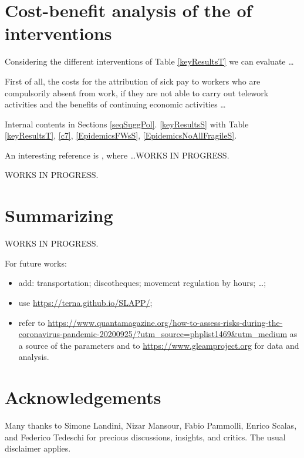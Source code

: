 \documentclass[11pt]{article}
\begin{document}
\section{Cost-benefit analysis of the of interventions}
\label{CBanalysis}

Considering  the different interventions of Table \ref{keyResultsT} we can evaluate \ldots

First of all, the costs for the attribution of sick pay to workers who are compulsorily absent from work, if they are not able to carry out telework activities and the benefits of continuing economic activities \ldots

Internal contents in Sections \ref{seqSuggPol}. 
\ref{keyResultsS} with Table \ref{keyResultsT}, \ref{c7}, 
\ref{EpidemicsFWsS}, 
\ref{EpidemicsNoAllFragileS}.

An interesting reference is \cite{doi:10.1111/ijcp.13674}, where \ldots WORKS IN PROGRESS.

WORKS IN PROGRESS.


\section{Summarizing}

WORKS IN PROGRESS.

For future works:
\begin{itemize}

\item add: transportation; discotheques; movement regulation by hours; \ldots;

\item use \url{https://terna.github.io/SLAPP/};

\item refer to \url{https://www.quantamagazine.org/how-to-assess-risks-during-the-coronavirus-pandemic-20200925/?utm_source=phplist1469&utm_medium} as a source of the parameters and to \url{https://www.gleamproject.org} for data and analysis.

\end{itemize}

\section*{Acknowledgements}

Many thanks to Simone Landini, Nizar Mansour, Fabio Pammolli, Enrico Scalas, and Federico Tedeschi for precious discussions, insights, and critics. The usual disclaimer applies.
\end{document}
